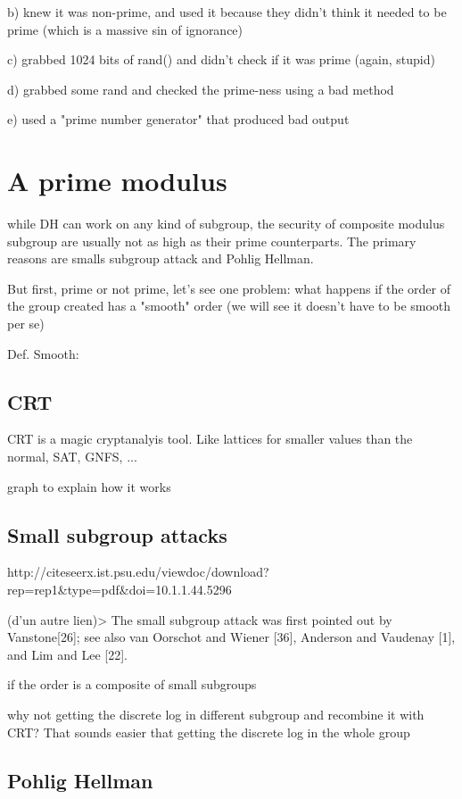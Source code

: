 \documentclass[a4paper,11pt]{article}
\begin{document}
b) knew it was non-prime, and used it because they didn't think it needed to be prime (which is a massive sin of ignorance)

c) grabbed 1024 bits of rand() and didn't check if it was prime (again, stupid)

d) grabbed some rand and checked the prime-ness using a bad method

e) used a "prime number generator" that produced bad output


\section{A prime modulus}

while DH can work on any kind of subgroup, the security of composite modulus subgroup are usually not as high as their prime counterparts. The primary reasons are smalls subgroup attack and Pohlig Hellman.

But first, prime or not prime, let's see one problem: what happens if the order of the group created has a "smooth" order (we will see it doesn't have to be smooth per se)

Def. Smooth:

\subsection{CRT}

CRT is a magic cryptanalyis tool. Like lattices for smaller values than the normal, SAT, GNFS, ...

graph to explain how it works

\subsection{Small subgroup attacks}

http://citeseerx.ist.psu.edu/viewdoc/download?rep=rep1&type=pdf&doi=10.1.1.44.5296

(d'un autre lien)> The small subgroup attack was first pointed out by Vanstone[26]; see also van Oorschot and Wiener [36], Anderson and Vaudenay [1], and Lim and Lee [22].

if the order is a composite of small subgroups

why not getting the discrete log in different subgroup and recombine it with CRT? That sounds easier that getting the discrete log in the whole group

\subsection{Pohlig Hellman}
\end{document}
